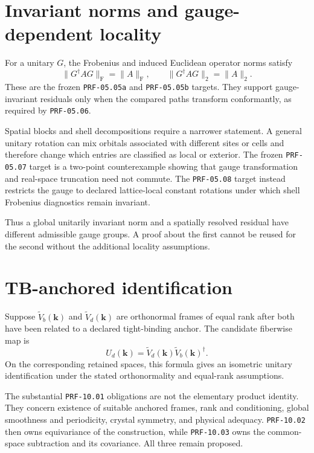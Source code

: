 \section{Invariant norms and gauge-dependent locality}

For a unitary $G$, the Frobenius and induced Euclidean operator norms satisfy
\begin{equation}
  \|G^{\dagger}AG\|_{\mathrm F}=\|A\|_{\mathrm F},
  \qquad
  \|G^{\dagger}AG\|_2=\|A\|_2.
\end{equation}
These are the frozen \texttt{PRF-05.05a} and \texttt{PRF-05.05b} targets. They
support gauge-invariant residuals only when the compared paths transform
conformantly, as required by \texttt{PRF-05.06}.

Spatial blocks and shell decompositions require a narrower statement. A general
unitary rotation can mix orbitals associated with different sites or cells and
therefore change which entries are classified as local or exterior. The frozen
\texttt{PRF-05.07} target is a two-point counterexample showing that gauge
transformation and real-space truncation need not commute. The
\texttt{PRF-05.08} target instead restricts the gauge to declared lattice-local
constant rotations under which shell Frobenius diagnostics remain invariant.

Thus a global unitarily invariant norm and a spatially resolved residual have
different admissible gauge groups. A proof about the first cannot be reused for
the second without the additional locality assumptions.

\section{TB-anchored identification}

Suppose $\widetilde V_b(\mathbf k)$ and
$\widetilde V_d(\mathbf k)$ are orthonormal frames of equal rank after both have
been related to a declared tight-binding anchor. The candidate fiberwise map is
\begin{equation}
  U_d(\mathbf k)
  =
  \widetilde V_d(\mathbf k)
  \widetilde V_b(\mathbf k)^{\dagger}.
\end{equation}
On the corresponding retained spaces, this formula gives an isometric unitary
identification under the stated orthonormality and equal-rank assumptions.

The substantial \texttt{PRF-10.01} obligations are not the elementary product
identity. They concern existence of suitable anchored frames, rank and
conditioning, global smoothness and periodicity, crystal symmetry, and physical
adequacy. \texttt{PRF-10.02} then owns equivariance of the construction, while
\texttt{PRF-10.03} owns the common-space subtraction and its covariance. All
three remain proposed.

